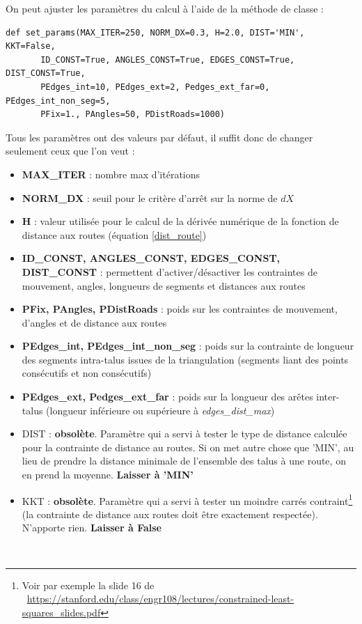 \documentclass[11pt]{article}
\begin{document}
On peut ajuster les paramètres du calcul à l'aide de la méthode de classe :
\begin{verbatim}
def set_params(MAX_ITER=250, NORM_DX=0.3, H=2.0, DIST='MIN', KKT=False,
       ID_CONST=True, ANGLES_CONST=True, EDGES_CONST=True, DIST_CONST=True,
       PEdges_int=10, PEdges_ext=2, Pedges_ext_far=0, PEdges_int_non_seg=5, 
       PFix=1., PAngles=50, PDistRoads=1000)
\end{verbatim}

Tous les paramètres ont des valeurs par défaut, il suffit donc de changer seulement ceux que l'on veut :
\begin{itemize}
	\item \textbf{MAX\_ITER} : nombre max d'itérations
	\item \textbf{NORM\_DX} : seuil pour le critère d'arrêt sur la norme de $dX$
	\item \textbf{H} : valeur utilisée pour le calcul de la dérivée numérique de la fonction de distance aux routes (équation \eqref{dist_route})
	\item \textbf{ID\_CONST, ANGLES\_CONST, EDGES\_CONST, DIST\_CONST} : permettent d'activer/désactiver les contraintes de mouvement, angles, longueurs de segments et distances aux routes
	\item \textbf{PFix, PAngles, PDistRoads} : poids sur les contraintes de mouvement, d'angles et de distance aux routes
	\item \textbf{PEdges\_int, PEdges\_int\_non\_seg} : poids sur la contrainte de longueur des segments intra-talus issues de la triangulation (segments liant des points consécutifs et non consécutifs)
	\item \textbf{PEdges\_ext, Pedges\_ext\_far} : poids sur la longueur des arêtes inter-talus (longueur inférieure ou supérieure à \textit{edges\_dist\_max})
	\item DIST : \textbf{obsolète}. Paramètre qui a servi à tester le type de distance calculée pour la contrainte de distance au routes. Si on met autre chose que 'MIN', au lieu de prendre la distance minimale de l'ensemble des talus à une route, on en prend la moyenne. \textbf{Laisser à 'MIN'}
	\item KKT : \textbf{obsolète}. Paramètre qui a servi à tester un moindre carrés contraint\footnote{\label{kkt} Voir par exemple la slide 16 de \    \url{https://stanford.edu/class/engr108/lectures/constrained-least-squares_slides.pdf}} (la contrainte de distance aux routes doit être exactement respectée). N'apporte rien. \textbf{Laisser à False}
\end{itemize}
\
\end{document}
